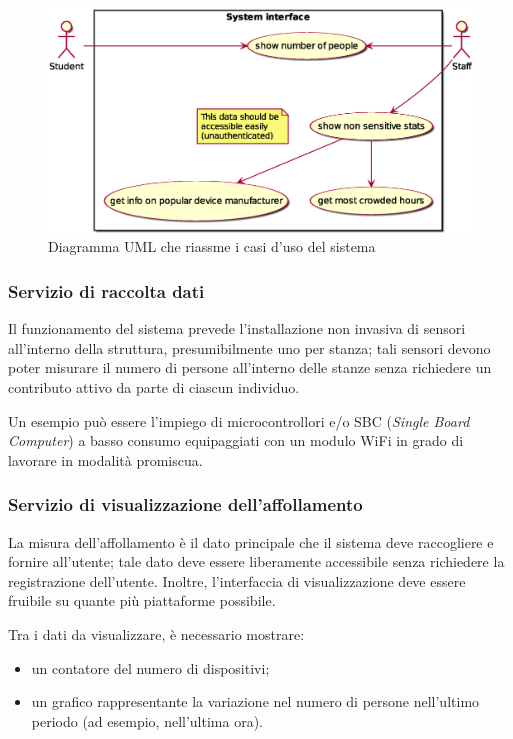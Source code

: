 \begin{figure}[H]
  \centering
  \includegraphics[width=\textwidth]{res/out/use-case.eps}
  \caption{Diagramma UML che riassme i casi d'uso del sistema}%
  \label{fig:use-cases}
\end{figure}

\subsubsection{Servizio di raccolta dati}

Il funzionamento del sistema prevede l'installazione non invasiva di sensori all'interno della struttura, presumibilmente uno per stanza;
tali sensori devono poter misurare il numero di persone all'interno delle stanze senza richiedere un contributo attivo da parte di ciascun individuo.

Un esempio può essere l'impiego di microcontrollori e/o SBC (\emph{Single Board Computer}) a basso consumo equipaggiati con un modulo WiFi in grado di lavorare in modalità promiscua.

\subsubsection{Servizio di visualizzazione dell'affollamento}

La misura dell'affollamento è il dato principale che il sistema deve raccogliere e fornire all'utente;
tale dato deve essere liberamente accessibile senza richiedere la registrazione dell'utente.
Inoltre, l'interfaccia di visualizzazione deve essere fruibile su quante più piattaforme possibile.

Tra i dati da visualizzare, è necessario mostrare:

\begin{itemize}
  \item un contatore del numero di dispositivi;
  \item un grafico rappresentante la variazione nel numero di persone nell'ultimo periodo (ad esempio, nell'ultima ora).
\end{itemize}

